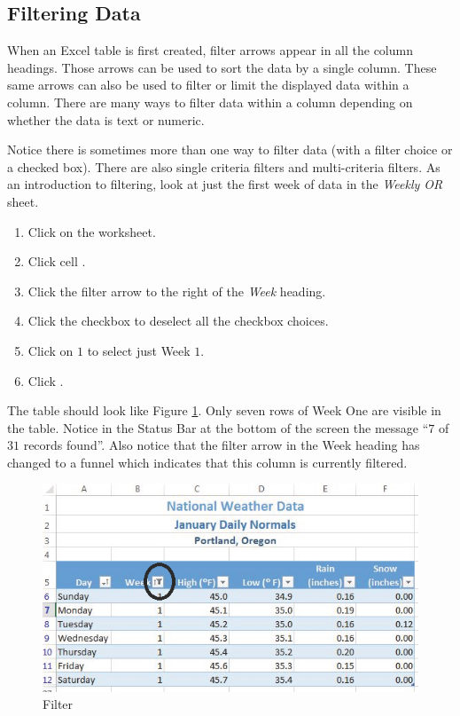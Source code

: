 \subsection{Filtering Data}

When an Excel table is first created, filter arrows appear in all the column headings. Those arrows can be used to sort the data by a single column. These same arrows can also be used to filter or limit the displayed data within a column. There are many ways to filter data within a column depending on whether the data is text or numeric. 

Notice there is sometimes more than one way to filter data (\ie with a filter choice or a checked box). There are also single criteria filters and multi-criteria filters. As an introduction to filtering, look at just the first week of data in the \textit{Weekly OR} sheet.

\begin{enumbox}
	\begin{enumerate}
		\item Click on the  worksheet.
		\item Click cell .
		\item Click the filter arrow to the right of the \textit{Week} heading.
		\item Click the  checkbox to deselect all the checkbox choices.
		\item Click on $ 1 $ to select just Week $ 1 $.
		\item Click .
	\end{enumerate}
\end{enumbox}
	
The table should look like Figure \ref{05:fig16}. Only seven rows of Week One are visible in the table. Notice in the Status Bar at the bottom of the screen the message ``$ 7 $ of $ 31 $ records found''. Also notice that the filter arrow in the Week heading has changed to a funnel which indicates that this column is currently filtered.

\begin{figure}[H]
	\centering
	\includegraphics[width=\maxwidth{.95\linewidth}]{gfx/ch05_fig16}
	\caption{Filter}
	\label{05:fig16}
\end{figure}

